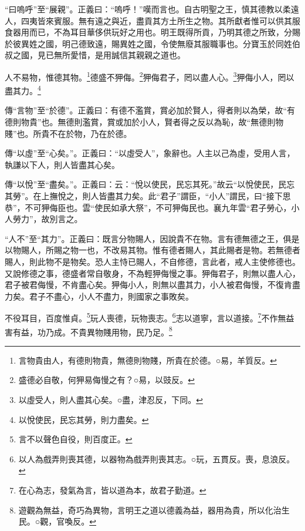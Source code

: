 {\noindent\shu{}\fzkt “曰嗚呼”至“展親”。正義曰：“嗚呼！”嘆而言也。自古明聖之王，慎其德教以柔遠人，四夷皆來賓服。無有遠之與近，盡貢其方土所生之物。其所獻者惟可以供其服食器用而已，不為耳目華侈供玩好之用也。明王既得所貢，乃明其德之所致，分賜於彼異姓之國，明己德致遠，賜異姓之國，令使無廢其服職事也。分寶玉於同姓伯叔之國，見已無所愛惜，是用誠信其親親之道也。 \par}

人不易物，惟德其物。\footnote{言物貴由人，有德則物貴，無德則物賤，所貴在於德。○易，羊質反。}德盛不狎侮。\footnote{盛德必自敬，何狎易侮慢之有？○易，以豉反。}狎侮君子，罔以盡人心。\footnote{以虛受人，則人盡其心矣。○盡，津忍反，下同。}狎侮小人，罔以盡其力。\footnote{以悅使民，民忘其勞，則力盡矣。}


{\noindent\zhuan{}\fzbyks 傳“言物”至“於德”。正義曰：有德不濫賞，賞必加於賢人，得者則以為榮，故“有德則物貴”也。無德則濫賞，賞或加於小人，賢者得之反以為恥，故“無德則物賤”也。所貴不在於物，乃在於德。 \par}

{\noindent\zhuan{}\fzbyks 傳“以虛”至“心矣。”。正義曰：“以虛受人”，象辭也。人主以己為虛，受用人言，執謙以下人，則人皆盡其心矣。 \par}

{\noindent\zhuan{}\fzbyks 傳“以悅”至“盡矣。”。正義曰：云：“悅以使民，民忘其死。”故云“以悅使民，民忘其勞”。在上撫悅之，則人皆盡其力矣。此“君子”謂臣，“小人”謂民，曰“接下思恭”，不可狎侮臣也。雲“使民如承大祭”，不可狎侮民也。襄九年雲“君子勞心，小人勞力”，故別言之。 \par}

{\noindent\shu{}\fzkt “人不”至“其力”。正義曰：既言分物賜人，因說貴不在物。言有德無德之王，俱是以物賜人，所賜之物一也，不改易其物。惟有德者賜人，其此賜者是物。若無德者賜人，則此物不是物矣。恐人主恃已賜人，不自修德，言此者，戒人主使修德也。又說修德之事，德盛者常自敬身，不為輕狎侮慢之事。狎侮君子，則無以盡人心，君子被君侮慢，不肯盡心矣。狎侮小人，則無以盡其力，小人被君侮慢，不復肯盡力矣。君子不盡心，小人不盡力，則國家之事敗矣。 \par}

不役耳目，百度惟貞。\footnote{言不以聲色自役，則百度正。}玩人喪德，玩物喪志。\footnote{以人為戲弄則喪其德，以器物為戲弄則喪其志。○玩，五貫反。喪，息浪反。}志以道寧，言以道接。\footnote{在心為志，發氣為言，皆以道為本，故君子勤道。}不作無益害有益，功乃成。不貴異物賤用物，民乃足。\footnote{遊觀為無益，奇巧為異物，言明王之道以德義為益，器用為貴，所以化治生民。○觀，官喚反。}


